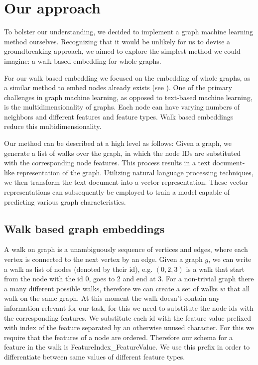 \section{Our approach}
To bolster our understanding, we decided to implement a graph machine learning method ourselves. Recognizing that it would be unlikely for us to devise a groundbreaking approach, we aimed to explore the simplest method we could imagine: a walk-based embedding for whole graphs.

For our walk based embedding we focused on the embedding of whole graphs, as a similar method to embed nodes already exists (see \cite{2016node2vec}). One of the primary challenges in graph machine learning, as opposed to text-based machine learning, is the multidimensionality of graphs. Each node can have varying numbers of neighbors and different features and feature types. Walk based embeddings reduce this multidimensionality.

Our method can be described at a high level as follows: Given a graph, we generate a list of walks over the graph, in which the node IDs are substituted with the corresponding node features. This process results in a text document-like representation of the graph. Utilizing natural language processing techniques, we then transform the text document into a vector representation. These vector representations can subsequently be employed to train a model capable of predicting various graph characteristics.

\subsection{Walk based graph embeddings}
A walk on graph is a unambiguously sequence of vertices and edges, where each vertex is connected to the next vertex by an edge. Given a graph $g$, we can write a walk as list of nodes (denoted by their id), e.g. $(0, 2, 3)$ is a walk that start from the node with the id $0$, goes to $2$ and end at $3$. For a non-trivial graph there a many different possible walks, therefore we can create a set of walks $w$ that all walk on the same graph. At this moment the walk doesn't contain any information relevant for our task, for this we need to substitute the node ids with the corresponding features. We substitute each id with the feature value prefixed with index of the feature separated by an otherwise unused character. For this we require that the features of a node are ordered. Therefore our schema for a feature in the walk is FeatureIndex\_FeatureValue. We use this prefix in order to differentiate between same values of different feature types.

